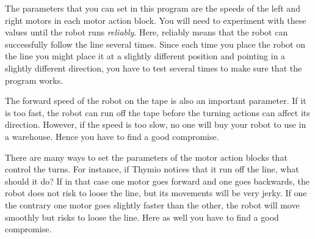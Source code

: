 
The parameters that you can set in this program are the speeds of the
left and right motors in each motor action block. You will need to
experiment with these values until the robot runs \emph{reliably}. Here,
reliably means that the robot can successfully follow the line several times.
Since each time you place the robot on
the line you might place it at a slightly different position and
pointing in a slightly different direction, you have to test several times to make sure that the program works.

The forward speed of the robot on the tape is also an important parameter.
If it is too fast, the robot can run off the tape before the turning actions can affect its direction. However, if the speed is too slow, no one will buy your robot to use in a warehouse.
Hence you have to find a good compromise.

There are many ways to set the parameters of the motor action blocks that control the turns.
For instance, if Thymio notices that it run off the line, what should it do?
If in that case one motor goes forward and one goes backwards, the robot does not risk to loose the line, but its movements will be very jerky.
If one the contrary one motor goes slightly faster than the other, the robot will move smoothly but risks to loose the line.
Here as well you have to find a good compromise.


\vfill


